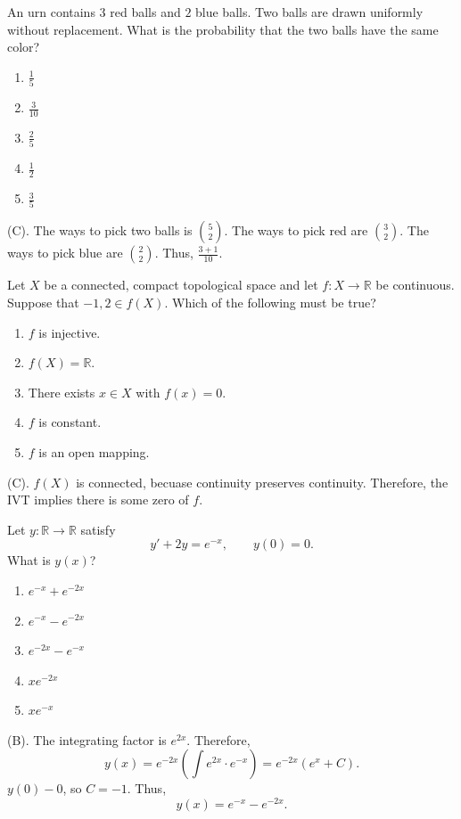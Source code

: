 \begin{exercise}
An urn contains $3$ red balls and $2$ blue balls. Two balls are drawn uniformly
without replacement.
What is the probability that the two balls have the same color?
\begin{enumerate}[label=(\Alph*)]
\item $\frac15$
\item $\frac3{10}$
\item $\frac25$
\item $\frac12$
\item $\frac35$
\end{enumerate}
\end{exercise}
\begin{solution}
(C). The ways to pick two balls is ${5 \choose 2}$. The ways to pick red 
are ${3 \choose 2}$. The ways to pick blue are ${2 \choose 2}$.
Thus, $\frac{3+1}{10}$.
\end{solution}

\begin{exercise}
Let $X$ be a connected, compact topological space and let $f:X\to\mathbb R$ be continuous.
Suppose that $-1,2\in f(X)$.
Which of the following must be true? \begin{enumerate}[label=(\Alph*)]
\item $f$ is injective.
\item $f(X)=\mathbb R$.
\item There exists $x\in X$ with $f(x)=0$.
\item $f$ is constant.
\item $f$ is an open mapping.
\end{enumerate}
\end{exercise}
\begin{solution}
(C). $f(X)$ is connected, becuase continuity preserves continuity. Therefore, 
the IVT implies there is some zero of $f$.
\end{solution}

\begin{exercise}
Let $y:\mathbb R\to\mathbb R$ satisfy
\[
y'+2y=e^{-x},
\qquad y(0)=0.
\]
What is $y(x)$?
\begin{enumerate}[label=(\Alph*)]
\item $e^{-x}+e^{-2x}$
\item $e^{-x}-e^{-2x}$
\item $e^{-2x}-e^{-x}$
\item $xe^{-2x}$
\item $xe^{-x}$
\end{enumerate}
\end{exercise}
\begin{solution}
(B). The integrating factor is $e^{2x}$. Therefore,
\[
y(x) = e^{-2x} \left(\int e^{2x} \cdot e^{-x}\right)
= e^{-2x}\left(e^x + C\right).
\]
$y(0) - 0$, so $C = -1$. Thus,
\[
y(x) = e^{-x} - e^{-2x}.
\]
\end{solution}

